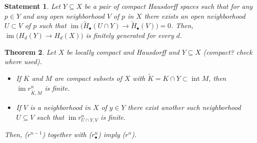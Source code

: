 \documentclass{amsart}
\newtheorem{theorem}{Theorem}
\newtheorem{statement}[theorem]{Statement}
\DeclareMathOperator{\im}{im}
\DeclareMathOperator{\interior}{int}
\begin{document}
	\begin{statement}
		Let $Y \subseteq X$ be a pair of compact Hausdorff spaces such that for any $p \in Y$ and any open neighborhood $V$ of $p$ in $X$ there exists an open neighborhood $U \subset V$ of $p$ such that $\im \big(\widetilde H_\bullet(U \cap Y) \to \widetilde H_\bullet(V)\big) = 0$. Then, $\im \big(H_d(Y) \to H_d(X)\big)$ is finitely generated for every $d$.
	\end{statement}

	\begin{theorem}
		Let $X$ be locally compact and Hausdorff and $Y \subseteq X$ (compact? check where used).
		\begin{itemize}
			\item[$(r^n)$] If $K$ and $M$ are compact subsets of $X$ with $\widetilde K = K \cap Y \subset \interior M$, then $\im r^n_{\widetilde K, M}$ is finite.
			\item[$(r^n_\bullet)$] If $V$ is a neighborhood in $X$ of $y \in Y$ there exist another such neighborhood $U \subseteq V$ such that $\im r^n_{U \cap Y, V}$ is finite.
		\end{itemize}
		Then, ($r^{n-1}$) together with ($r^n_\bullet$) imply ($r^n$).
	\end{theorem}
\end{document}
